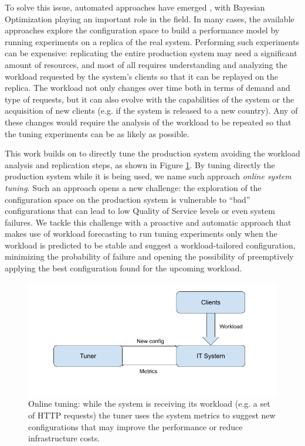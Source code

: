 \documentclass[a4paper, 12pt]{article} %
\begin{document}
	To solve this issue, automated approaches have emerged \cite{AkamasCGP, LearningToSample, OtterTune, OtterTune2}, with Bayesian Optimization playing an important role in the field. In many cases, the available approaches explore the configuration space to build a performance model by running experiments on a replica of the real system. Performing such experiments can be expensive: replicating the entire production system may need a significant amount of resources, and most of all requires understanding and analyzing the workload requested by the system's clients so that it can be replayed on the replica. The workload not only changes over time both in terms of demand and type of requests, but it can also evolve with the capabilities of the system or the acquisition of new clients (e.g. if the system is released to a new country). Any of these changes would require the analysis of the workload to be repeated so that the tuning experiments can be as likely as possible.
	
	This work builds on \cite{AkamasCGP} to directly tune the production system avoiding the workload analysis and replication steps, as shown in Figure \ref{fig:online_tuning}. By tuning directly the production system while it is being used, we name such approach \textit{online system tuning}. Such an approach opens a new challenge: the exploration of the configuration space on the production system is vulnerable to ``bad'' configurations that can lead to low Quality of Service levels or even system failures.  We tackle this challenge with a proactive and automatic approach that makes use of workload forecasting to run tuning experiments only when the workload is predicted to be stable and suggest a workload-tailored configuration, minimizing the probability of failure and opening the possibility of preemptively applying the best configuration found for the upcoming workload. 
	
	\begin{figure}[!b] \label{fig:online_tuning}
		\includegraphics[width=\linewidth]{img/online_tuning.png}
		\caption{Online tuning: while the system is receiving its workload (e.g. a set of HTTP requests) the tuner uses the system metrics to suggest new configurations that may improve the performance or reduce infrastructure costs.}
	\end{figure}
	
\end{document}
